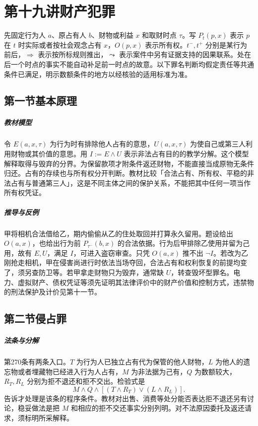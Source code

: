 \chapter{第十九讲\quad 财产犯罪}
\label{lecture:19}
\par

先固定行为人 $a$、原占有人 $b$、财物或利益 $x$ 和取财时点 $\tau$。写 $P_t(p,x)$ 表示 $p$ 在 $t$ 时实际或者按社会观念占有 $x$，$O(p,x)$ 表示所有权。$t^-,t^+$ 分别是某行为前后，$\Rightarrow$ 表示按所标规则推出，$\leadsto$ 表示案件中另有证据支持的因果联系。处在后一个时点的事实不能自动补足前一时点的故意。以下罪名判断均假定责任等共通条件已满足，明示数额条件的地方以经核验的适用标准为准。

\section{第一节\quad 基本原理}

\paragraph{教材模型}
令 $E(a,x,\tau)$ 为行为时有排除他人占有的意思，$U(a,x,\tau)$ 为使自己或第三人利用财物或其价值的意思。用 $I:=E\land U$ 表示非法占有目的的教学分解。这个模型解释取得与毁弃的分界。为保留款项才附条件返还财物，不能直接当成原物无条件归还。占有的存续也与所有权分开判断。教材比较「合法占有、所有权、平稳的非法占有与普通第三人」，这是不同主体之间的保护关系，不能把其中任何一项当作所有权凭证。

\paragraph{推导与反例}
甲将相机合法借给乙，期内偷偷从乙的住处取回并打算永久留用。题设给出 $O(a,x)$，也给出行为前 $P_{\tau^-}(b,x)$ 的合法依据。行为后甲排除乙使用并留为己用，故有 $E,U$，满足 $I$，可进入盗窃审查。只凭 $O(a,x)$ 推不出 $\neg I$。若改为乙刚抢走相机，甲在侵害尚进行时依法当场夺回，合法占有和权利恢复的前提均变了，须另查防卫等。若甲拿走财物只为毁弃，通常缺 $U$，转查毁坏型罪名。电力、虚拟财产、债权凭证等须先证明其法律评价中的财产价值和控制方式，违禁物的刑法保护及计价见第十一节。

\section{第二节\quad 侵占罪}

\paragraph{法条与分解}
第270条有两条入口。$T$ 为行为人已独立占有代为保管的他人财物，$L$ 为他人的遗忘物或者埋藏物已经进入行为人占有，$M$ 为非法据为己有，$Q$ 为数额较大，$R_T,R_L$ 分别为拒不退还和拒不交出。检验式是
\[
 M\land Q\land[(T\land R_T)\lor(L\land R_L)] .
\]
告诉才处理是该条的程序条件。教材对出售、消费等处分能否表达拒不退还另有讨论，稳妥做法是把 $M$ 和相应的拒不交还事实分别列明。对不法原因委托及返还请求，须标明所采解释。

